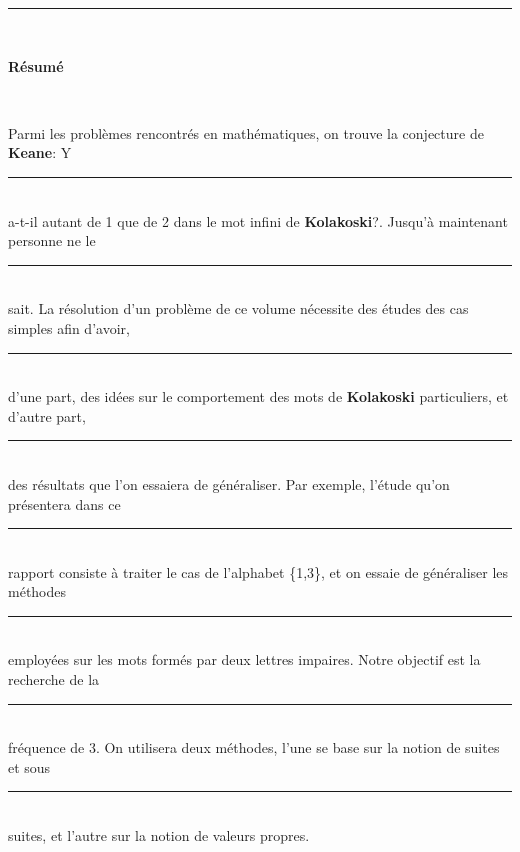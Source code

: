 \documentclass[12pt,a4paper,oneside]{book}
\begin{document}
\rule{1\textwidth}{0pt} \\
     \begin{center}
           {\Huge \textbf{Résumé}}\\
     \end{center} \\ 
\vspace{10\baselineskip}
\thispagestyle{empty}
\par Parmi les problèmes rencontrés en mathématiques, on trouve la conjecture de \textbf{Keane}: Y 
\rule{1\textwidth}{0pt} \\
 a-t-il autant de 1 que de 2 dans le mot infini de \textbf{Kolakoski}?.  Jusqu'à maintenant personne ne le 
\rule{1\textwidth}{0pt} \\ 
sait. La résolution d'un problème de ce volume nécessite des études des cas simples afin d'avoir, 
\rule{1\textwidth}{0pt} \\ 
d'une part, des idées sur le comportement des mots de \textbf{Kolakoski} particuliers, et d'autre part, 
\rule{1\textwidth}{0pt} \\
 des résultats que l'on essaiera de généraliser. Par exemple, l'étude qu'on présentera dans ce 
 \rule{1\textwidth}{0pt} \\ 
 rapport consiste à traiter le cas de l'alphabet \{1,3\}, et on essaie de généraliser les méthodes \rule{1\textwidth}{0pt} \\ 
 employées sur les mots formés par deux lettres impaires. Notre objectif est la recherche de la 
\rule{1\textwidth}{0pt} \\
  fréquence de 3. On utilisera deux méthodes, l'une se base sur la notion de suites et sous 
\rule{1\textwidth}{0pt} \\ 
  suites, et l'autre sur la notion de valeurs propres. 
\tableofcontents
\thispagestyle{empty}
\pagebreak
\end{document}
